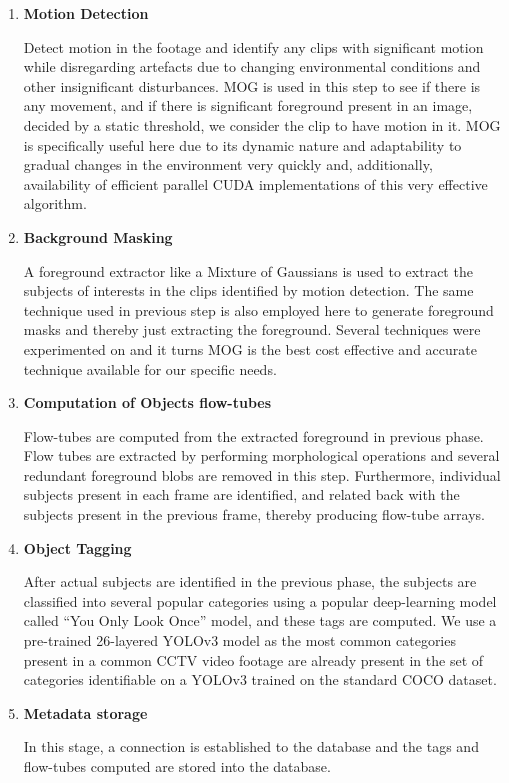 \begin{enumerate}
    \item \textbf{Motion Detection}

    Detect motion in the footage and identify any clips with significant motion while disregarding artefacts due to changing environmental conditions and other insignificant disturbances.
    MOG is used in this step to see if there is any movement, and if there is significant foreground present in an image, decided by a static threshold, we consider the clip to have motion in it. MOG is specifically useful here due to its dynamic nature and adaptability to gradual changes in the environment very quickly and, additionally, availability of efficient parallel CUDA implementations of this very effective algorithm.

    \item \textbf{Background Masking}

	A foreground extractor like a Mixture of Gaussians is used to extract the subjects of interests in the clips identified by motion detection.
    The same technique used in previous step is also employed here to generate foreground masks and thereby just extracting the foreground. Several techniques were experimented on and it turns MOG is the best cost effective and accurate technique available for our specific needs.

    \item \textbf{Computation of Objects flow-tubes}

	Flow-tubes are computed from the extracted foreground in previous phase.
    Flow tubes are extracted by performing morphological operations and several redundant foreground blobs are removed in this step. Furthermore, individual subjects present in each frame are identified, and related back with the subjects present in the previous frame, thereby producing flow-tube arrays.

    \item \textbf{Object Tagging}

	After actual subjects are identified in the previous phase, the subjects are classified into several popular categories using a popular deep-learning model called “You Only Look Once” model, and these tags are computed.
	We use a pre-trained 26-layered YOLOv3 model as the most common categories present in a common CCTV video footage are already present in the set of categories identifiable on a YOLOv3 trained on the standard COCO dataset.

    \item \textbf{Metadata storage}

    In this stage, a connection is established to the database and the tags and flow-tubes computed are stored into the database.
\end{enumerate}

